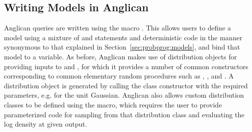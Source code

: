 \subsection{Writing Models in Anglican}
\label{sec:probprog:anglican:models} 

Anglican queries are written using the macro .  This allows users to define a model using a mixture
of \sample and \observe statements and deterministic code in the manner synonymous to that explained in
Section~\ref{sec:probprog:models}, and bind that model to a variable.  
As before, Anglican makes use of distribution objects for providing inputs to \sample and \observe, for which
it provides a number of common constructors corresponding to common
elementary random procedures such
as \gammaa, \normal, and \betaa.  A distribution object is generated by calling the class constructor
with the required parameters, e.g. {\small {}} for the unit Gaussian.
Anglican also allows custom distribution classes to be defined using
the  macro, which requires the user to provide parameterized code for sampling from that distribution
class and evaluating the log density at given output.

